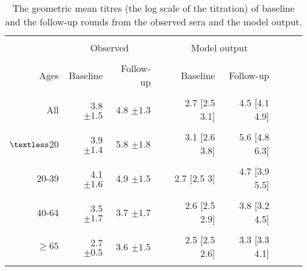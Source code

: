 \documentclass{article}
\begin{document}
\begin{table}[ht]
\begin{minipage}{\textwidth}   
\caption{The geometric mean titres (the log scale of the titration) of baseline and the follow-up rounds from the observed sera and the model output.} %
\centering %
\begin{tabular*}{13cm}{rrrrrrrrr}

\hline\hline \\%
&  \multicolumn{2}{c}{Observed}  & &  \multicolumn{2}{c}{Model output} \\
 \cline{2-3}  \cline{5-6} \\
 Ages &  Baseline &       Follow-up &   &     Baseline &      Follow-up   \\
\hline \\ %
  All 				&  3.8 $\pm1.5$ &   4.8 $\pm1.3$ & &   2.7 [2.5  3.1] &   4.5 [4.1 4.9] \\ \\

  $\textless $20  	&  3.9 $\pm1.4$ &   5.8 $\pm1.8$ & &   3.1 [2.6  3.8] &   5.6 [4.8 6.3] \\ \\

  20-39 			&  4.1 $\pm1.6$ &   4.9 $\pm1.5$ & &   2.7 [2.5  3] &     4.7 [3.9 5.5] \\ \\

  40-64				&  3.5 $\pm1.7$ &   3.7 $\pm1.7$ & &   2.6 [2.5  2.9] &   3.8 [3.2 4.5] \\ \\

  $\geq65$ 			&  2.7 $\pm0.5$ &   3.6 $\pm1.5$ & &   2.5 [2.5  2.6] &   3.3 [3.3 4.1] \\ \\
\hline %
\end{tabular*}
\end{minipage}
\end{table}


            
\end{document}
